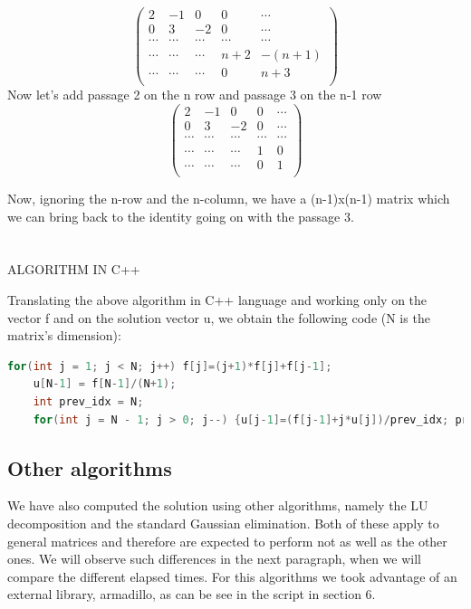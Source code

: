 \documentclass {article}
\begin{document}
\begin{equation}
\left(
\begin{array}{ccccc}
  2 & -1 & 0 & 0 & \cdots \\
  0 & 3 & -2 & 0 & \cdots \\
  \cdots & \cdots & \cdots & \cdots & \cdots \\
  \cdots & \cdots & \cdots & n+2 & -(n+1) \\
  \cdots & \cdots & \cdots & 0 & n+3 \\
\end{array}
\right)
\end{equation}
Now let's add passage 2 on the n row and passage 3 on the n-1 row
\begin{equation}
\left(
\begin{array}{ccccc}
  2 & -1 & 0 & 0 & \cdots \\
  0 & 3 & -2 & 0 & \cdots \\
  \cdots & \cdots & \cdots & \cdots & \cdots \\
  \cdots & \cdots & \cdots & 1 & 0 \\
  \cdots & \cdots & \cdots & 0 & 1 \\
\end{array}
\right)
\end{equation}

Now, ignoring the n-row and the n-column, we have a (n-1)x(n-1) matrix which we can bring back to the identity going on with the passage 3.
\\
\\
\\
ALGORITHM IN C++

Translating the above algorithm in C++ language and working only on the vector f and on the solution vector u, we obtain the following code (N is the matrix's dimension):

\begin{lstlisting}[language=cpp]
    for(int j = 1; j < N; j++) f[j]=(j+1)*f[j]+f[j-1];
    u[N-1] = f[N-1]/(N+1);
    int prev_idx = N;
    for(int j = N - 1; j > 0; j--) {u[j-1]=(f[j-1]+j*u[j])/prev_idx; prev_idx = j;}
\end{lstlisting}

\subsection{Other algorithms}
We have also computed the solution using other algorithms, namely the LU decomposition and the standard Gaussian elimination. Both of these apply to general matrices and therefore are expected to perform not as well as the other ones. We will observe such differences in the next paragraph, when we will compare the different elapsed times. For this algorithms we took advantage of an external library, armadillo, as can be see in the script in section 6.
\end{document}
